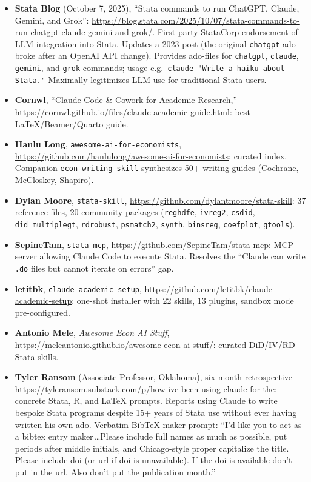 \documentclass[11pt]{article}
\begin{document}
\begin{itemize}[leftmargin=*,nosep]
    \item \textbf{Stata Blog} (October 7, 2025), ``Stata commands to run ChatGPT, Claude, Gemini, and Grok'': \url{https://blog.stata.com/2025/10/07/stata-commands-to-run-chatgpt-claude-gemini-and-grok/}. First-party StataCorp endorsement of LLM integration into Stata. Updates a 2023 post (the original \texttt{chatgpt} ado broke after an OpenAI API change). Provides ado-files for \texttt{chatgpt}, \texttt{claude}, \texttt{gemini}, and \texttt{grok} commands; usage e.g.\ \texttt{claude "Write a haiku about Stata."} Maximally legitimizes LLM use for traditional Stata users.
    \item \textbf{Cornwl}, ``Claude Code \& Cowork for Academic Research,'' \url{https://cornwl.github.io/files/claude-academic-guide.html}: best \LaTeX/Beamer/Quarto guide.
    \item \textbf{Hanlu Long}, \texttt{awesome-ai-for-economists}, \url{https://github.com/hanlulong/awesome-ai-for-economists}: curated index. Companion \texttt{econ-writing-skill} synthesizes 50+ writing guides (Cochrane, McCloskey, Shapiro).
    \item \textbf{Dylan Moore}, \texttt{stata-skill}, \url{https://github.com/dylantmoore/stata-skill}: 37 reference files, 20 community packages (\texttt{reghdfe}, \texttt{ivreg2}, \texttt{csdid}, \texttt{did\_multiplegt}, \texttt{rdrobust}, \texttt{psmatch2}, \texttt{synth}, \texttt{binsreg}, \texttt{coefplot}, \texttt{gtools}).
    \item \textbf{SepineTam}, \texttt{stata-mcp}, \url{https://github.com/SepineTam/stata-mcp}: MCP server allowing Claude Code to execute Stata. Resolves the ``Claude can write \texttt{.do} files but cannot iterate on errors'' gap.
    \item \textbf{letitbk}, \texttt{claude-academic-setup}, \url{https://github.com/letitbk/claude-academic-setup}: one-shot installer with 22 skills, 13 plugins, sandbox mode pre-configured.
    \item \textbf{Antonio Mele}, \emph{Awesome Econ AI Stuff}, \url{https://meleantonio.github.io/awesome-econ-ai-stuff/}: curated DiD/IV/RD Stata skills.
    \item \textbf{Tyler Ransom} (Associate Professor, Oklahoma), six-month retrospective \url{https://tyleransom.substack.com/p/how-ive-been-using-claude-for-the}: concrete Stata, R, and \LaTeX{} prompts. Reports using Claude to write bespoke Stata programs despite 15+ years of Stata use without ever having written his own ado. Verbatim BibTeX-maker prompt: ``I'd like you to act as a bibtex entry maker\,\dots Please include full names as much as possible, put periods after middle initials, and Chicago-style proper capitalize the title. Please include doi (or url if doi is unavailable). If the doi is available don't put in the url. Also don't put the publication month.''

\end{itemize}
\end{document}
